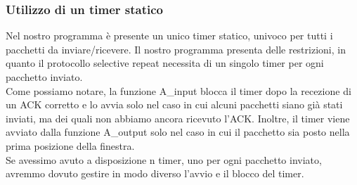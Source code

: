 \documentclass[a4paperr]{article}
\begin{document}
\subsubsection{Utilizzo di un timer statico}
Nel nostro programma è presente un unico timer statico, univoco per tutti i pacchetti da inviare/ricevere. Il nostro programma presenta delle restrizioni, in quanto il protocollo selective repeat necessita di un singolo timer per ogni pacchetto inviato. \\
Come possiamo notare, la funzione A\_input blocca il timer dopo la recezione di un ACK corretto e lo avvia solo nel caso in cui alcuni pacchetti siano già stati inviati, ma dei quali non abbiamo ancora ricevuto l’ACK. Inoltre, il timer viene avviato dalla funzione A\_output solo nel caso in cui il pacchetto sia posto nella prima posizione della finestra. \\
Se avessimo avuto a disposizione n timer, uno per ogni pacchetto inviato, avremmo dovuto gestire in modo diverso l’avvio e il blocco del timer.
\end{document}
